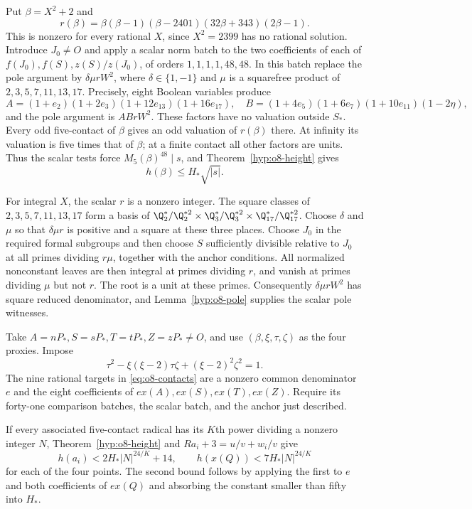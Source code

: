 Put $\beta=X^2+2$ and
\[
 r(\beta)=\beta(\beta-1)(\beta-2401)(32\beta+343)(2\beta-1).
\]
This is nonzero for every rational $X$, since $X^2=2399$ has no
rational solution. Introduce $J_0\ne O$ and apply a scalar norm
batch to the two coefficients of each of
$f(J_0),f(S),z(S)/z(J_0)$, of orders $1,1,1,1,48,48$.
In this batch replace the pole argument by $\delta\mu rW^2$, where
$\delta\in\{1,-1\}$ and $\mu$ is a squarefree product of
$2,3,5,7,11,13,17$. Precisely, eight Boolean variables produce
\[
 A=(1+e_2)(1+2e_3)(1+12e_{13})(1+16e_{17}),\quad
 B=(1+4e_5)(1+6e_7)(1+10e_{11})(1-2\eta),
\]
and the pole argument is $ABrW^2$. These factors have no valuation
outside $S_*$. Every odd five-contact of $\beta$ gives an odd
valuation of $r(\beta)$ there. At infinity its valuation is five
times that of $\beta$; at a finite contact all other factors are units.
Thus the scalar tests force $M_5(\beta)^{48}\mid s$, and
Theorem~\ref{hyp:o8-height} gives
\begin{equation}\label{eq:o8-scalarheight}
 h(\beta)\le H_*\sqrt{|s|}.
\end{equation}

For integral $X$, the scalar $r$ is a nonzero integer. The square
classes of $2,3,5,7,11,13,17$ form a basis of
$\Q_2^*/\Q_2^{*2}\times\Q_3^*/\Q_3^{*2}
\times\Q_{17}^*/\Q_{17}^{*2}$.
Choose $\delta$ and $\mu$ so that $\delta\mu r$ is positive and
a square at these three places. Choose $J_0$ in the required formal
subgroups and then choose $S$ sufficiently divisible relative to $J_0$
at all primes dividing $r\mu$, together with the anchor conditions.
All normalized nonconstant leaves are then integral at primes dividing
$r$, and vanish at primes dividing $\mu$ but not $r$. The root is
a unit at these primes. Consequently $\delta\mu rW^2$ has square
reduced denominator, and Lemma~\ref{hyp:o8-pole} supplies the
scalar pole witnesses.

Take $A=nP_*,S=sP_*,T=tP_*,Z=zP_*\ne O$, and use
$(\beta,\xi,\tau,\zeta)$ as the four proxies. Impose
\begin{equation}\label{eq:o8-Lucas}
 \tau^2-\xi(\xi-2)\tau\zeta+(\xi-2)^2\zeta^2=1.
\end{equation}
The nine rational targets in \eqref{eq:o8-contacts} are a nonzero
common denominator $e$ and the eight coefficients of
$ex(A),ex(S),ex(T),ex(Z)$. Require its forty-one comparison batches,
the scalar batch, and the anchor just described.

If every associated five-contact radical has its $K$th power dividing
a nonzero integer $N$, Theorem~\ref{hyp:o8-height} and
$Ra_i+3=u/v+w_i/v$ give
\[
 h(a_i)<2H_*|N|^{24/K}+14,
 \qquad h(x(Q))<7H_*|N|^{24/K}
\]
for each of the four points. The second bound follows by applying the
first to $e$ and both coefficients of $ex(Q)$ and absorbing the
constant smaller than fifty into $H_*$.

